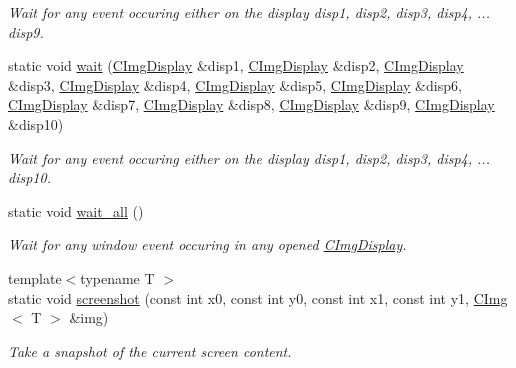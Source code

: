 \begin{DoxyCompactItemize}
\begin{DoxyCompactList}\small\item\em Wait for any event occuring either on the display {\ttfamily disp1}, {\ttfamily disp2}, {\ttfamily disp3}, {\ttfamily disp4}, ... {\ttfamily disp9}. \end{DoxyCompactList}\item 
\mbox{\label{structcimg__library__suffixed_1_1CImgDisplay_a4b7b65720f01c2593470f8b943ad5932}} 
static void \hyperlink{structcimg__library__suffixed_1_1CImgDisplay_a4b7b65720f01c2593470f8b943ad5932}{wait} (\hyperlink{structcimg__library__suffixed_1_1CImgDisplay}{C\+Img\+Display} \&disp1, \hyperlink{structcimg__library__suffixed_1_1CImgDisplay}{C\+Img\+Display} \&disp2, \hyperlink{structcimg__library__suffixed_1_1CImgDisplay}{C\+Img\+Display} \&disp3, \hyperlink{structcimg__library__suffixed_1_1CImgDisplay}{C\+Img\+Display} \&disp4, \hyperlink{structcimg__library__suffixed_1_1CImgDisplay}{C\+Img\+Display} \&disp5, \hyperlink{structcimg__library__suffixed_1_1CImgDisplay}{C\+Img\+Display} \&disp6, \hyperlink{structcimg__library__suffixed_1_1CImgDisplay}{C\+Img\+Display} \&disp7, \hyperlink{structcimg__library__suffixed_1_1CImgDisplay}{C\+Img\+Display} \&disp8, \hyperlink{structcimg__library__suffixed_1_1CImgDisplay}{C\+Img\+Display} \&disp9, \hyperlink{structcimg__library__suffixed_1_1CImgDisplay}{C\+Img\+Display} \&disp10)
\begin{DoxyCompactList}\small\item\em Wait for any event occuring either on the display {\ttfamily disp1}, {\ttfamily disp2}, {\ttfamily disp3}, {\ttfamily disp4}, ... {\ttfamily disp10}. \end{DoxyCompactList}\item 
\mbox{\label{structcimg__library__suffixed_1_1CImgDisplay_a4ef184cd0e79fca248c0ae4df5710206}} 
static void \hyperlink{structcimg__library__suffixed_1_1CImgDisplay_a4ef184cd0e79fca248c0ae4df5710206}{wait\+\_\+all} ()
\begin{DoxyCompactList}\small\item\em Wait for any window event occuring in any opened \hyperlink{structcimg__library__suffixed_1_1CImgDisplay}{C\+Img\+Display}. \end{DoxyCompactList}\item 
{\footnotesize template$<$typename T $>$ }\\static void \hyperlink{structcimg__library__suffixed_1_1CImgDisplay_a264122e4cc7584dfa57678ceda68bfbb}{screenshot} (const int x0, const int y0, const int x1, const int y1, \hyperlink{structcimg__library__suffixed_1_1CImg}{C\+Img}$<$ T $>$ \&img)
\begin{DoxyCompactList}\small\item\em Take a snapshot of the current screen content. \end{DoxyCompactList}\end{DoxyCompactItemize}


